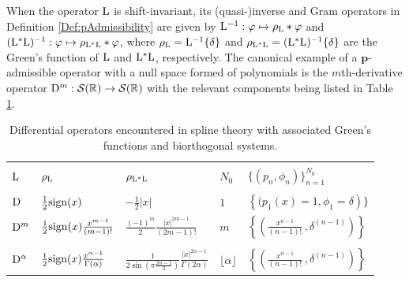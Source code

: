 \documentclass[11pt, english,english]{article}
\newcommand{\R}{ \mathbb{R}}
\newcommand{\Lop}{{\rm L}}
\newcommand{\Dop}{{\rm D}}
\def\V#1{{\boldsymbol{#1}}}         %
\def\Spc#1{{\mathcal{#1}}}  %
\renewcommand{\[}{\begin{equation}}
\renewcommand{\]}[1]{\label{eq:#1}\end{equation}}
\begin{document}
When the operator $\Lop$ is shift-invariant, its (quasi-)inverse and Gram operators in Definition \ref{Def:pAdmissibility} are given by $\Lop^{-1}: \varphi \mapsto \rho_\Lop \ast \varphi$ and $(\Lop^\ast\Lop)^{-1}: \varphi \mapsto \rho_{\Lop^\ast\Lop} \ast \varphi$, where $\rho_\Lop=\Lop^{-1}\{\delta\}$ and $\rho_{\Lop^\ast\Lop}=(\Lop^\ast\Lop)^{-1}\{\delta\}$
are the Green's function of $\Lop$ and $\Lop^\ast\Lop$, respectively. The canonical example of a $\V p$-admissible operator with a null space formed of polynomials is the $m$th-derivative operator $\Dop^m: \Spc S(\R) \to \Spc S(\R)$ with the relevant components being listed in Table \ref{Tab:Derivatives}.
\begin{table}\label{tab:convolution}

\begin{tabular}{p{0.6cm}p{2.4cm}p{2.6cm}p{0.5cm}p{4cm}}
 \hline\\[-2ex]
    $\Lop$ &$\rho_{\Lop}$ & $\rho_{\Lop^\ast\Lop}$ &$N_0$ & $\{(p_n,\phi_n)\}_{n=1}^{N_0}$\\[1ex]
    \hline\\[1ex]
    $\Dop$ & $\tfrac{1}{2}{\rm sign}(x)$ & $-\tfrac{1}{2}|x|$ & $1$ & $\left\{(p_1(x)=1,\phi_1=\delta\right)\}$ \\[2ex]
     $\Dop^m$ & $\tfrac{1}{2}{\rm sign}(x) \frac{x^{m-1}}{(m-1) !}$ & $\tfrac{(-1)^m}{2}\frac{|x|^{2m-1}}{(2m-1)!}$ & $m$ & $\left\{(\frac{x^{n-1}}{(n-1)!}\,,\delta^{(n-1)})\right\}$ \\   
\\
     $\Dop^\alpha$ & $\tfrac{1}{2}{\rm sign}(x) \frac{x^{\alpha-1}}{\Gamma(\alpha)}$ & $\tfrac{1}{2 \sin(\pi  \tfrac{2\alpha-1}{2})}\frac{|x|^{2\alpha-1}}{\Gamma(2\alpha)}$ & $\lfloor \alpha\rfloor$ & $\left\{(\frac{x^{n-1}}{(n-1)!}\,,\delta^{(n-1)})\right\}$\\[2ex]        \hline
\end{tabular} \caption{Differential operators encountered in spline theory with associated Green's functions
and biorthogonal systems.\label{Tab:Derivatives} }
\end{table}
\end{document}
